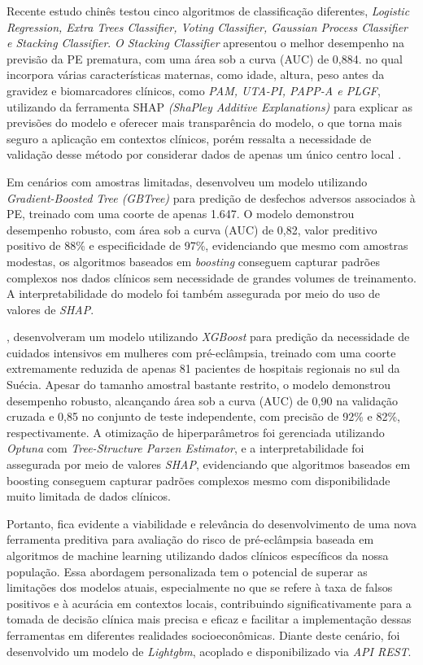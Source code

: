 \documentclass[12pt, a4paper]{report}
\theoremstyle{definition}
\theoremstyle{remark}
\theoremstyle{plain}
\begin{document}
Recente estudo chinês testou cinco algoritmos de classificação diferentes, \textit{Logistic Regression, Extra Trees Classifier, Voting Classifier, Gaussian Process Classifier e Stacking Classifier}. \textit{O Stacking Classifier} apresentou o melhor desempenho na previsão da PE prematura, com uma área sob a curva (AUC) de 0,884. no qual incorpora várias características maternas, como idade, altura, peso antes da gravidez e biomarcadores clínicos, como \textit{PAM, UTA-PI, PAPP-A e PLGF}, utilizando da ferramenta SHAP \textit{(ShaPley Additive Explanations)} para explicar as previsões do modelo e oferecer mais transparência do modelo, o que torna mais seguro a aplicação em contextos clínicos, porém ressalta a necessidade de validação desse método por considerar dados de apenas um único centro local \cite{Li2024}.

Em cenários com amostras limitadas, \textcite{Schmidt2022} desenvolveu um modelo utilizando \textit{Gradient-Boosted Tree (GBTree)} para predição de desfechos adversos associados à PE, treinado com uma coorte de apenas 1.647. O modelo demonstrou desempenho robusto, com área sob a curva (AUC) de 0,82, valor preditivo positivo de 88\% e especificidade de 97\%, evidenciando que mesmo com amostras modestas, os algoritmos baseados em \textit{boosting} conseguem capturar padrões complexos nos dados clínicos sem necessidade de grandes volumes de treinamento. A interpretabilidade do modelo foi também assegurada por meio do uso de valores de \textit{SHAP}.

\textcite{Edvinsson2024}, desenvolveram um modelo utilizando \textit{XGBoost} para predição da necessidade de cuidados intensivos em mulheres com pré-eclâmpsia, treinado com uma coorte extremamente reduzida de apenas 81 pacientes de hospitais regionais no sul da Suécia. Apesar do tamanho amostral bastante restrito, o modelo demonstrou desempenho robusto, alcançando área sob a curva (AUC) de 0,90 na validação cruzada e 0,85 no conjunto de teste independente, com precisão de 92\% e 82\%, respectivamente. A otimização de hiperparâmetros foi gerenciada utilizando \textit{Optuna} com \textit{Tree-Structure Parzen Estimator}, e a interpretabilidade foi assegurada por meio de valores \textit{SHAP}, evidenciando que algoritmos baseados em boosting conseguem capturar padrões complexos mesmo com disponibilidade muito limitada de dados clínicos.

Portanto, fica evidente a viabilidade e relevância do desenvolvimento de uma nova ferramenta preditiva para avaliação do risco de pré-eclâmpsia baseada em algoritmos de machine learning utilizando dados clínicos específicos da nossa população. Essa abordagem personalizada tem o potencial de superar as limitações dos modelos atuais, especialmente no que se refere à taxa de falsos positivos e à acurácia em contextos locais, contribuindo significativamente para a tomada de decisão clínica mais precisa e eficaz e facilitar a implementação dessas ferramentas em diferentes realidades socioeconômicas. Diante deste cenário, foi desenvolvido um modelo de \textit{Lightgbm}, acoplado e disponibilizado via \textit{API REST}.
\end{document}
